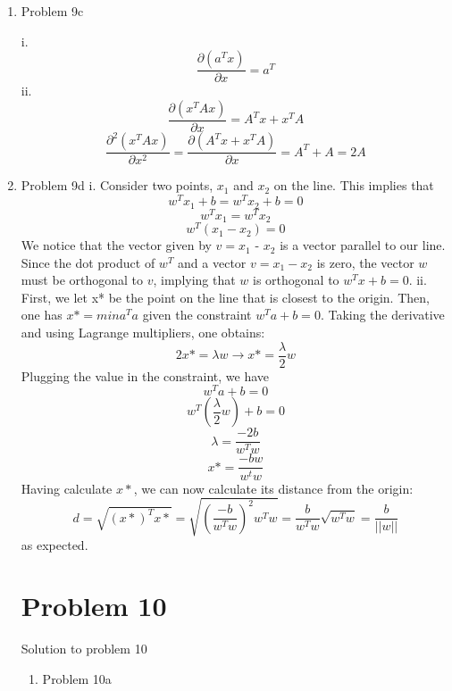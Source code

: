\documentclass[11pt]{article}
\newcommand{\solution}[1]{{{\color{blue}{\bf Solution:} {#1}}}}
\begin{document}
\begin{enumerate}
\vspace{0.5cm}
\item Problem 9c

\solution{ \newline
i. \[\frac{\partial{(a^{T}x)}}{\partial{x}} = a^{T} \]
ii. \[ \frac{\partial{(x^{T}Ax)}}{\partial{x}} = A^{T}x + x^{T}A \]
\[ \frac{\partial^2{(x^{T}Ax)}}{\partial{x^2}} = \frac{\partial{(A^Tx + x^TA)}}{\partial{x}} = A^{T} + A = 2A \]
}
\vspace{0.5cm}
\item Problem 9d
\solution{ \newline
i. Consider two points, $x_1$ and $x_2$ on the line. This implies that \[ w^Tx_1 + b = w^Tx_2 + b = 0 \] \[w^Tx_1=w^Tx_2\]
\[w^T(x_1-x_2) = 0 \]
We notice that the vector given by $v = x_1$ - $x_2$ is a vector parallel to our line. Since the dot product of $w^T$ and a vector $v = x_1 - x_2 $ is zero, the vector $w$ must be orthogonal to $v$, implying that $w$ is orthogonal to $w^Tx + b = 0$.
\newline \newline
ii. First, we let x* be the point on the line that is closest to the origin. Then, one has $ x* = min a^{T}a $ given the constraint $ w^{T}a + b = 0 $. Taking the derivative and using Lagrange multipliers, one obtains: \[2x* = \lambda w \longrightarrow  x* = \frac{\lambda}{2}w \]
Plugging the value in the constraint, we have \[ w^{T}a + b = 0 \] \[w^{T}(\frac{\lambda}{2}w) +b =  0 \] \[\lambda = \frac{-2b}{w^Tw} \] \[x* = \frac{-bw}{w^tw} \]
Having calculate $ x* $, we can now calculate its distance from the origin: \[d = \sqrt{(x*)^{T}x*} = \sqrt{(\frac{-b}{w^Tw})^2 w^Tw} = \frac{b}{w^Tw}\sqrt{w^Tw} = \frac{b}{||w||} \] as expected.
}

\newpage

\section{Problem 10}

\solution{Solution to problem 10}
\begin{enumerate}
\item Problem 10a


\end{enumerate}
\end{enumerate}
\end{document}
